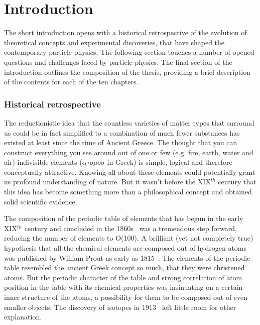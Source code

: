 \chapter*{Introduction}



The short introduction opens with a historical retrospective of the evolution of theoretical concepts and experimental discoveries, that have shaped the contemporary particle physics. The following section touches a number of opened questions and challenges faced by particle physics. The final section of the introduction outlines the composition of the thesis, providing a brief description of the contents for each of the ten chapters.
\subsection*{Historical retrospective}
    The reductionistic idea that the countless varieties of matter types that surround us could be in fact simplified to a combination of much fewer substances has existed at least since the time of Ancient Greece. The thought that you can construct everything you see around out of one or few (e.g. fire, earth, water and air) indivisible elements ($\alpha \tau o \mu o \sigma$ in Greek) is simple, logical and therefore conceptually attractive. Knowing all about these elements could potentially grant us profound understanding of nature. But it wasn't before the XIX$^{th}$ century that this idea has become something more than a philosophical concept and obtained solid scientific evidence. 

The composition of the periodic table of elements that has begun in the early XIX$^{th}$ century and concluded in the 1860s~\cite{mendel} was a tremendous step forward, reducing the number of elements to O(100). A brilliant (yet not completely true) hypothesis that all the chemical elements are composed out of hydrogen atoms was published by William Prout as early as 1815~\cite{prout}. The elements of the periodic table resembled the ancient Greek concept so much, that they were christened atoms. But the periodic character of the table and strong correlation of atom position in the table with its chemical properties was insinuating on a certain inner structure of the atoms, a possibility for them to be composed out of even smaller objects. The discovery of isotopes in 1913~\cite{isotopes} left little room for other explanation.

